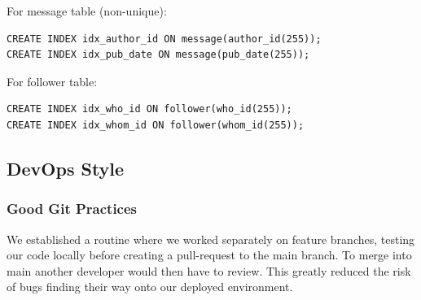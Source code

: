 \documentclass{article}
\begin{document}
For message table (non-unique):
\begin{verbatim}
CREATE INDEX idx_author_id ON message(author_id(255));
CREATE INDEX idx_pub_date ON message(pub_date(255));
\end{verbatim}

For follower table:
\begin{verbatim}
CREATE INDEX idx_who_id ON follower(who_id(255));
CREATE INDEX idx_whom_id ON follower(whom_id(255));
\end{verbatim}

\subsection{DevOps Style}

\subsubsection{Good Git Practices}
We established a routine where we worked separately on feature branches, testing our code locally before creating a pull-request to the main branch. To merge into main another developer would then have to review. This greatly reduced the risk of bugs finding their way onto our deployed environment.
\end{document}
